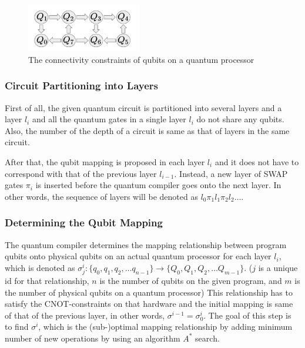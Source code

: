   \begin{figure}[ht]
  	\begin{center}
  		\includegraphics[width=5cm]{img/quantum-processor.png}
		\caption{The connectivity constraints of qubits on a quantum processor}
	\end{center}
\end{figure}
	
 
\subsubsection{Circuit Partitioning into Layers}

 First of all, the given quantum circuit is partitioned into several layers and a layer $l_i$ and all the quantum gates in a single layer $l_i$ do not share any qubits. Also, the number of the depth of a circuit is same as that of layers in the same circuit.
 
 After that, the qubit mapping is proposed in each layer $l_i$ and it does not have to correspond with that of the previous layer  $l_{i-1}$. Instead, a new layer of SWAP gates $\pi_i$ is inserted before the quantum compiler goes onto the next layer. In other words, the sequence of layers will be denoted as $l_0 \pi_1 l_1\pi_2 l_2 \dots$.
 
\subsubsection{Determining the Qubit Mapping}

The quantum compiler determines the mapping relationship between program qubits onto physical qubits on an actual quantum processor for each layer $l_i$, which is denoted as $\sigma^i_j: \{q_0, q_1, q_2, \dots q_{n-1}\} \rightarrow \{Q_0, Q_1, Q_2, \dots Q_{m-1}\}$. ($j$ is a unique id for that relationship, $n$ is the number of qubits on the given program, and $m$ is the number of physical qubits on a quantum processor) This relationship has to satisfy the CNOT-constraints on that hardware and the initial mapping is same of that of the previous layer, in other words, $\sigma^{i-1} = \sigma^i_0$.  The goal of this step is to find $\sigma^{i}$, which is the (sub-)optimal mapping relationship by adding minimum number of new operations by using an algorithm $A^{*}$ search.

